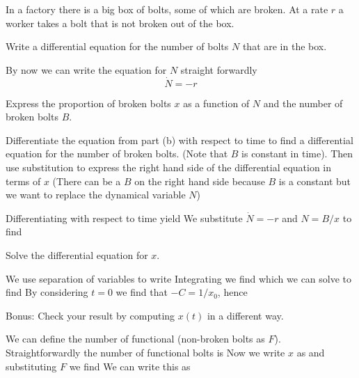 In a factory there is a big box of bolts, some of which are broken. At a rate $r$ a worker takes a bolt that is not broken out of the box. 

\subquestion
Write a differential equation for the number of bolts $N$ that are in the box.

\solution
By now we can write the equation for $N$ straight forwardly 
\begin{equation}
 \dot{N}=-r
\end{equation}

\subquestion
Express the proportion of broken bolts $x$ as a function of $N$ and the number of broken bolts $B$.  

\solution
{}

\subquestion 
Differentiate the equation from part (b) with respect to time to find a differential equation for the number of broken bolts. (Note that $B$ is constant in time). Then use substitution to express the right hand side of the differential equation in terms of $x$ (There can be a $B$ on the right hand side because $B$ is a constant but we want to replace the dynamical variable $N$)

\solution
Differentiating with respect to time yield
We substitute $\dot{N}=-r$ and $N=B/x$ to find 

\subquestion
Solve the differential equation for $x$.

\solution
We use separation of variables to write 
Integrating we find
which we can solve to find 
By considering $t=0$ we find that $-C=1/x_0$, hence

\subquestion
Bonus: Check your result by computing $x(t)$ in a different way.

\solution 
We can define the number of  functional (non-broken bolts as $F$). Straightforwardly the number of functional bolts is 
Now we write $x$ as 
and substituting $F$ we find 
We can write this as 

